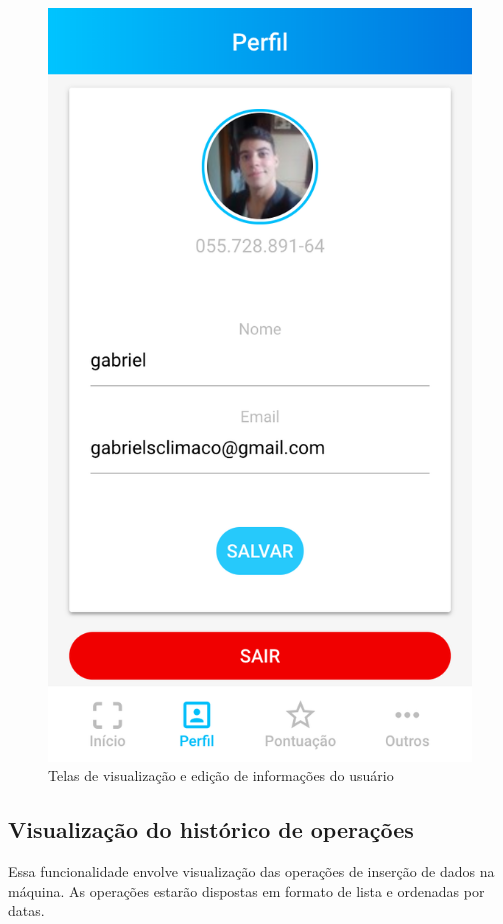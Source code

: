 \begin{figure}[!ht]
		\includegraphics[scale=0.2]{figuras/software/edit.png}
	\caption{Telas de visualização e edição de informações do usuário}
	\label{fig:user}
\end{figure}

\subsection{Visualização do histórico de operações}

Essa funcionalidade envolve visualização das operações de inserção de dados na máquina. As operações estarão dispostas em formato de lista e ordenadas por datas.

